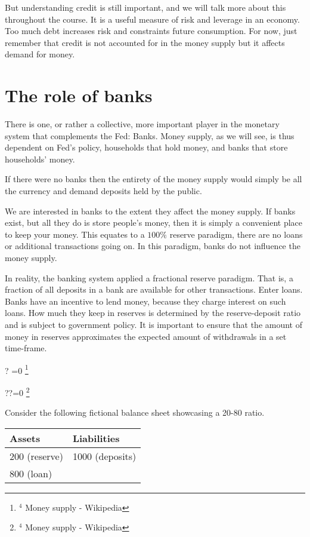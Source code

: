 \documentclass[10pt]{article}
\let\svthefootnote\thefootnote
\newcommand\blfootnotetext[1]{%
  \let\thefootnote\relax\footnote{#1}%
  \addtocounter{footnote}{-1}%
  \let\thefootnote\svthefootnote%
}
\let\svfootnotetext\footnotetext
\renewcommand\footnotetext[2][?]{%
  \if\relax#1\relax%
    \ifnum\value{footnote}=0\blfootnotetext{#2}\else\svfootnotetext{#2}\fi%
  \else%
    \if?#1\ifnum\value{footnote}=0\blfootnotetext{#2}\else\svfootnotetext{#2}\fi%
    \else\svfootnotetext[#1]{#2}\fi%
  \fi
}
\begin{document}
But understanding credit is still important, and we will talk more about this throughout the course. It is a useful measure of risk and leverage in an economy. Too much debt increases risk and constraints future consumption. For now, just remember that credit is not accounted for in the money supply but it affects demand for money.

\section*{The role of banks}
There is one, or rather a collective, more important player in the monetary system that complements the Fed: Banks. Money supply, as we will see, is thus dependent on Fed's policy, households that hold money, and banks that store households' money.

If there were no banks then the entirety of the money supply would simply be all the currency and demand deposits held by the public.

We are interested in banks to the extent they affect the money supply. If banks exist, but all they do is store people's money, then it is simply a convenient place to keep your money. This equates to a $100 \%$ reserve paradigm, there are no loans or additional transactions going on. In this paradigm, banks do not influence the money supply.

In reality, the banking system applied a fractional reserve paradigm. That is, a fraction of all deposits in a bank are available for other transactions. Enter loans. Banks have an incentive to lend money, because they charge interest on such loans. How much they keep in reserves is determined by the reserve-deposit ratio and is subject to government policy. It is important to ensure that the amount of money in reserves approximates the expected amount of withdrawals in a set time-frame.

Consider the following fictional balance sheet showcasing a 20-80 ratio.

\begin{center}
\begin{tabular}{|l|l|}
\hline
Assets & Liabilities \\
\hline
200 (reserve) & 1000 (deposits) \\
\hline
800 (loan) &  \\
\hline
\end{tabular}
\end{center}
\end{document}
